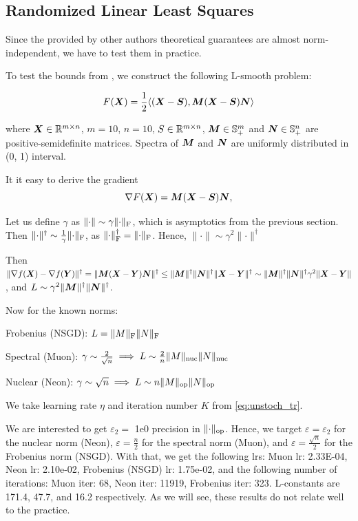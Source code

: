 \documentclass{article} %
\newcommand{\norm}[1]{\lVert #1\rVert}
\renewcommand{\epsilon}{\varepsilon}
\newcommand{\Rmn}{\R^{m\times n}}
\DeclarePairedDelimiter{\normf}{\|}{\|_\mathrm{F}}
\DeclarePairedDelimiter{\norms}{\|}{\|_{\mathrm{op}}}
\DeclarePairedDelimiter{\normn}{\|}{\|_{\mathrm{nuc}}}
\def\<#1,#2>{\langle #1,#2\rangle}
\begin{document}
    \subsection{Randomized Linear Least Squares}
    Since the provided by other authors \citep{kovalev2025understanding,riabinin2025gluon} theoretical guarantees are almost norm-independent, we have to test them in practice.

    To test the bounds from \citet{kovalev2025understanding}, we construct the following L-smooth problem:

    \begin{equation}\label{eq:lls}
        F(\mX) = \frac{1}{2} \<(\mX-\mS), \mM (\mX - \mS) \mN>
    \end{equation}

    where $\mX \in \Rmn$, $m=10$, $n=10$, $S \in \Rmn$, ${\bm{M}} \in \mathbb{S}^m_{+}$ and ${\bm{N}} \in \mathbb{S}^n_{+}$ are positive-semidefinite matrices. Spectra of ${\bm{M}}$ and ${\bm{N}}$ are uniformly distributed in (0, 1) interval.

    It it easy to derive the gradient
    \begin{equation}\label{eq:grad_lls}
        \nabla F({\bm{X}}) = {\bm{M}} ({\bm{X}} - {\bm{S}}) {\bm{N}},
    \end{equation}

    Let us define $\gamma$ as $\norm{\cdot} \sim \gamma \normf{\cdot}$, which is asymptotics from the previous section. Then $\norm{\cdot}^\dagger \sim \frac{1}{\gamma}\normf{\cdot}$, as $\normf{\cdot}^\dagger = \normf{\cdot}$. Hence, $\norm{\cdot} \sim \gamma^2 \norm{\cdot}^\dagger$

    Then $\norm{\nabla f(\mX) - \nabla f(\mY)}^\dagger = \norm{\mM (\mX - \mY) \mN}^\dagger \leq \norm{\mM}^\dagger \norm{\mN}^\dagger \norm{\mX - \mY}^\dagger \sim \norm{\mM}^\dagger \norm{\mN}^\dagger \gamma^2 \norm{\mX - \mY}$, and $L \sim \gamma^2 \norm{\mM}^\dagger \norm{\mN}^\dagger$.
    
    Now for the known norms:

    Frobenius (NSGD): $L = \normf{M} \normf{N}$

    Spectral (Muon): $\gamma \sim \frac{2}{\sqrt{n}} \implies L \sim \frac{2}{n}\normn{M}\normn{N}$
    
    Nuclear (Neon): $\gamma \sim \sqrt{n} \implies L \sim n\norms{M}\norms{N}$

    We take learning rate $\eta$ and iteration number $K$ from \cref{eq:unstoch_tr}.


    We are interested to get $\epsilon_2=$ 1e0 precision in $\norms{\cdot}$. Hence, we target $\epsilon = \epsilon_2$ for the nuclear norm (Neon), $\epsilon = \frac{n}{2}$ for the spectral norm (Muon), and $\epsilon = \frac{\sqrt{n}}{2}$ for the Frobenius norm (NSGD).
    With that, we get the following lrs: Muon lr: 2.33E-04, Neon lr: 2.10e-02, Frobenius (NSGD) lr: 1.75e-02, and the following number of iterations: Muon iter: 68, Neon iter: 11919, Frobenius iter: 323. L-constants are 171.4, 47.7, and 16.2 respectively. As we will see, these results do not relate well to the practice.
\end{document}

